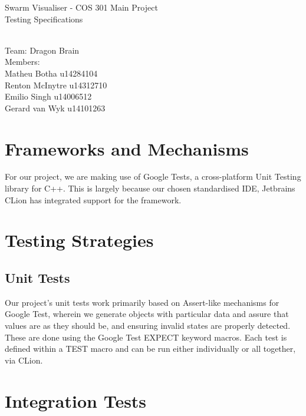 \documentclass[11pt]{article}
\begin{document}
\begin{titlepage}

\begin{center}
\begin{huge}
Swarm Visualiser - COS 301 Main Project
\\
Testing Specifications
\begin{small}
\\
Team: Dragon Brain
\\
Members:
\\
Matheu Botha u14284104
\\
Renton McInytre u14312710
\\
Emilio Singh u14006512
\\
Gerard van Wyk u14101263

\end{small}

\end{huge}
\end{center}
\end{titlepage}

\pagebreak

\tableofcontents

\pagebreak
\section{Frameworks and Mechanisms}
For our project, we are making use of Google Tests, a cross-platform Unit Testing library for C++. This is largely because our chosen standardised IDE, Jetbrains CLion has integrated support for the framework.

\section{Testing Strategies}

\subsection{Unit Tests}
Our project's unit tests work primarily based on Assert-like mechanisms for Google Test, wherein we generate objects with particular data and assure that values are as they should be, and ensuring invalid states are properly detected. These are done using the Google Test EXPECT keyword macros.
\newline Each test is defined within a TEST macro and can be run either individually or all together, via CLion. 


\section{Integration Tests}
\end{document}
